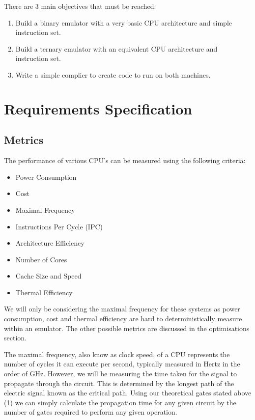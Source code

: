 \documentclass{article}
\begin{document}
There are 3 main objectives that must be reached:
\begin{enumerate}
  \item Build a binary emulator with a very basic CPU architecture and simple instruction set.
  \item Build a ternary emulator with an equivalent CPU architecture and instruction set.
  \item Write a simple complier to create code to run on both machines.
\end{enumerate}

\section{Requirements Specification}

\subsection{Metrics}

The performance of various CPU's can be measured using the following criteria:

\begin{itemize}
  \item Power Consumption
  \item Cost
  \item Maximal Frequency
  \item Instructions Per Cycle (IPC)
  \item Architecture Efficiency
  \item Number of Cores
  \item Cache Size and Speed
  \item Thermal Efficiency
\end{itemize}

We will only be considering the maximal frequency for these systems as power consumption, cost and thermal efficiency 
are hard to deterministically measure within an emulator. The other possible metrics are discussed in the optimisations
section.

The maximal frequency, also know as clock speed, of a CPU represents the number of cycles it can execute per 
second, typically measured in Hertz in the order of GHz. 
However, we will be measuring the time taken for the signal to propagate through the circuit. This is determined by the longest path 
of the electric signal known as the critical path. Using our theoretical gates stated above (1) we can simply 
calculate the propagation time for any given circuit by the number of gates required to perform any given operation.
\end{document}
